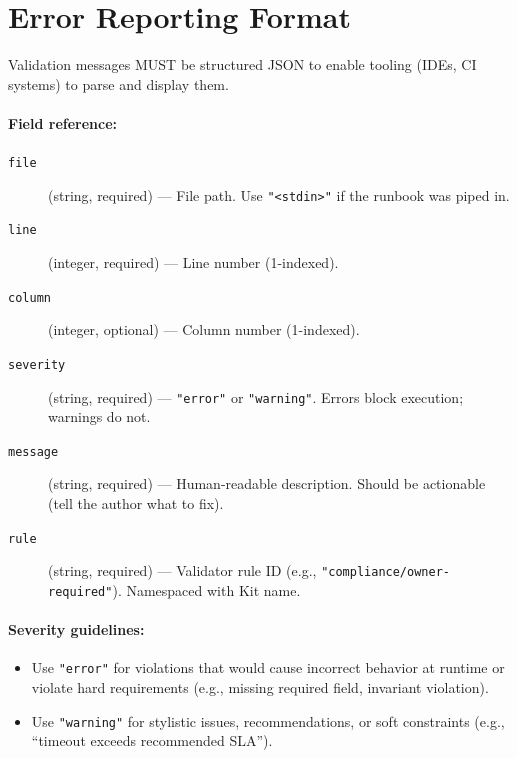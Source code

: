 \section{Error Reporting Format}
\label{sec:error-format}

Validation messages MUST be structured JSON to enable tooling (IDEs, CI systems)
to parse and display them.

\paragraph{Field reference:}

\begin{description}
  \item[\texttt{file}] (string, required) --- File path. Use \texttt{"<stdin>"}
    if the runbook was piped in.
  \item[\texttt{line}] (integer, required) --- Line number (1-indexed).
  \item[\texttt{column}] (integer, optional) --- Column number (1-indexed).
  \item[\texttt{severity}] (string, required) --- \texttt{"error"} or \texttt{"warning"}.
    Errors block execution; warnings do not.
  \item[\texttt{message}] (string, required) --- Human-readable description.
    Should be actionable (tell the author what to fix).
  \item[\texttt{rule}] (string, required) --- Validator rule ID (e.g.,
    \texttt{"compliance/owner-required"}). Namespaced with Kit name.
\end{description}

\paragraph{Severity guidelines:}

\begin{itemize}
  \item Use \texttt{"error"} for violations that would cause incorrect behavior
    at runtime or violate hard requirements (e.g., missing required field,
    invariant violation).
  \item Use \texttt{"warning"} for stylistic issues, recommendations, or soft
    constraints (e.g., ``timeout exceeds recommended SLA'').
\end{itemize}

